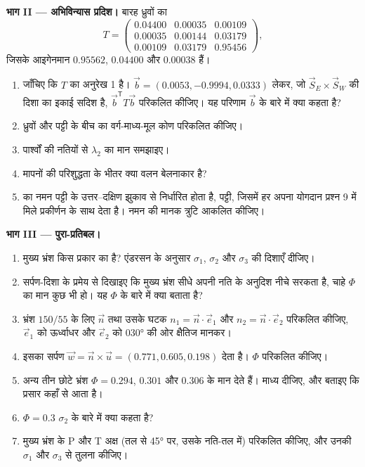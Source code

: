 \begin{problem}
\medskip\noindent\textbf{भाग II --- अभिविन्यास प्रदिश।}
बारह ध्रुवों का 
\[
  T = \begin{pmatrix} 0.04400 & 0.00035 & 0.00109\\ 0.00035 & 0.00144 & 0.03179\\
  0.00109 & 0.03179 & 0.95456 \end{pmatrix},
\]
जिसके आइगेनमान $0.95562$, $0.04400$ और $0.00038$ हैं।
\begin{enumerate}[resume]
  \item जाँचिए कि $T$ का अनुरेख 1 है। $\vec b = (0.0053, -0.9994,
        0.0333)$ लेकर, जो $\vec S_E\times\vec S_W$ की दिशा का इकाई सदिश है,
        $\vec b^{\mathsf T}T\vec b$ परिकलित कीजिए। यह परिणाम $\vec b$ के बारे में क्या कहता है?
  \item ध्रुवों और पट्टी के बीच का वर्ग-माध्य-मूल कोण परिकलित कीजिए।
  \item पार्श्वों की नतियों से $\lambda_2$ का मान समझाइए।
  \item मापनों की परिशुद्धता के भीतर क्या वलन बेलनाकार है?
  \item {} का नमन पट्टी के उत्तर--दक्षिण झुकाव से निर्धारित होता है,
        पट्टी, जिसमें हर  अपना योगदान
        प्रश्न 9 में मिले प्रकीर्णन के साथ देता है। नमन की मानक त्रुटि आकलित कीजिए।
\end{enumerate}

\medskip\noindent\textbf{भाग III --- पुरा-प्रतिबल।}
\begin{enumerate}[resume]
  \item मुख्य भ्रंश किस प्रकार का है? एंडरसन के अनुसार
        $\sigma_1$, $\sigma_2$ और $\sigma_3$ की दिशाएँ दीजिए।
  \item सर्पण-दिशा के प्रमेय से दिखाइए कि मुख्य भ्रंश सीधे अपनी नति के
        अनुदिश नीचे सरकता है, चाहे $\Phi$ का मान कुछ भी हो।
        यह $\Phi$ के बारे में क्या बताता है?
  \item भ्रंश $150/55$ के लिए $\vec n$ तथा उसके घटक $n_1 =
        \vec n\cdot\vec e_1$ और $n_2 = \vec n\cdot\vec e_2$ परिकलित कीजिए, $\vec e_1$ को
        ऊर्ध्वाधर और $\vec e_2$ को \ang{030} की ओर क्षैतिज मानकर।
  \item इसका सर्पण $\vec w = \vec n\times\vec u = (0.771, 0.605, 0.198)$ देता है।
        $\Phi$ परिकलित कीजिए।
  \item अन्य तीन छोटे भ्रंश $\Phi = 0.294$, $0.301$ और
        $0.306$ के मान देते हैं। माध्य दीजिए, और बताइए कि प्रसार कहाँ से आता है।
  \item $\Phi = 0.3$ $\sigma_2$ के बारे में क्या कहता है?
  \item मुख्य भ्रंश के P और T अक्ष (तल से \ang{45} पर, उसके
        नति-तल में) परिकलित कीजिए, और उनकी $\sigma_1$ और
        $\sigma_3$ से तुलना कीजिए।
\end{enumerate}


\end{problem}
